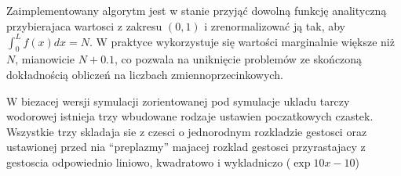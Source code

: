 
    
    Zaimplementowany algorytm jest w stanie przyjąć dowolną funkcję analityczną
    przybierajaca wartosci z zakresu $(0, 1)$
     i zrenormalizować ją tak, aby $\int_0^L
    f(x) dx = N$. W praktyce wykorzystuje się wartości marginalnie większe niż
    $N$, mianowicie $N+0.1$, co pozwala na uniknięcie problemów ze skończoną
    dokładnością obliczeń na liczbach zmiennoprzecinkowych.

    W biezacej wersji symulacji zorientowanej pod symulacje ukladu tarczy
    wodorowej istnieja trzy wbudowane rodzaje ustawien poczatkowych czastek.
    Wszystkie trzy skladaja sie z czesci o jednorodnym rozkladzie gestosci oraz
    ustawionej przed nia ``preplazmy'' majacej rozklad gestosci przyrastajacy z
    gestoscia odpowiednio liniowo, kwadratowo i wykladniczo ($\exp{10 x - 10}$)


